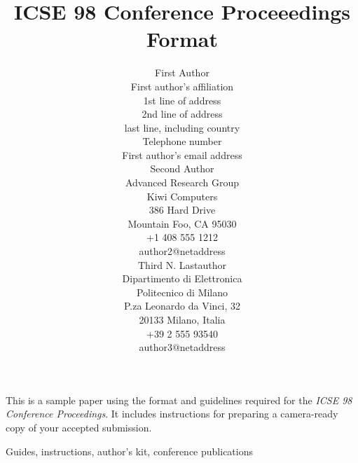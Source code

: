 


\title{ICSE 98 Conference Proceeedings Format}

\author{
        \hspace*{-2ex}
        \parbox{2.3in} {\begin{center}
	{\authornamefont First Author}\\ 
        First author's affiliation\\
        1st line of address\\
        2nd line of address\\
        last line, including country \\
	Telephone number\\
	First author's email address
	\end{center} }
        \parbox{2.3in} {\begin{center}
        {\authornamefont Second Author}\\
	Advanced Research Group\\
	Kiwi Computers\\
	386 Hard Drive\\
	Mountain Foo, CA  95030\\
	+1 408 555 1212\\
	author2@netaddress
	\end{center} }
        \parbox{2.3in} {\begin{center}
        {\authornamefont Third N. Lastauthor}\\
	Dipartimento di Elettronica\\
	Politecnico di Milano\\
	P.za Leonardo da Vinci, 32\\
	20133 Milano, Italia\\
	+39 2 555 93540\\
	author3@netaddress
	\end{center} }
}


\maketitle
\copyrightspace

\abstract
This is a sample paper using the format and guidelines 
required for the {\it ICSE 98 Conference Proceedings}. It 
includes instructions for preparing a camera-ready copy of 
your accepted submission.

\keywords
Guides, instructions, author's kit, conference publications

